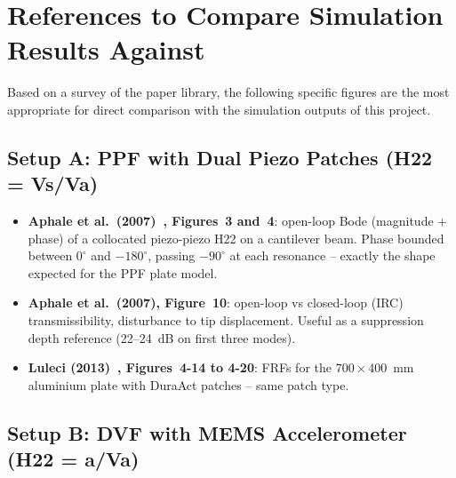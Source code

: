 \documentclass[12pt,a4paper]{article}
\begin{document}
\section{References to Compare Simulation Results Against}
\label{app:compare}

Based on a survey of the paper library, the following specific figures are the most
appropriate for direct comparison with the simulation outputs of this project.

\subsection*{Setup A: PPF with Dual Piezo Patches (H22 = Vs/Va)}

\begin{itemize}
  \item \textbf{Aphale et al.\ (2007)~\cite{aphale2007}, Figures~3 and~4}: open-loop
        Bode (magnitude + phase) of a collocated piezo-piezo H22 on a cantilever beam.
        Phase bounded between $0^\circ$ and $-180^\circ$, passing $-90^\circ$ at each
        resonance -- exactly the shape expected for the PPF plate model.
  \item \textbf{Aphale et al.\ (2007), Figure~10}: open-loop vs closed-loop (IRC)
        transmissibility, disturbance to tip displacement.  Useful as a suppression
        depth reference (22--24~dB on first three modes).
  \item \textbf{Luleci (2013)~\cite{luleci2013}, Figures~4-14 to 4-20}: FRFs for
        the $700 \times 400$~mm aluminium plate with DuraAct patches -- same patch type.
\end{itemize}

\subsection*{Setup B: DVF with MEMS Accelerometer (H22 = a/Va)}
\end{document}
